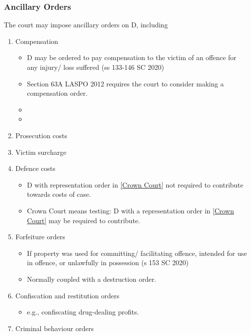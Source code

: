 \documentclass[
]{article}
\providecommand{\tightlist}{%
  \setlength{\itemsep}{0pt}\setlength{\parskip}{0pt}}
\begin{document}
\hypertarget{ancillary-orders}{%
\subsubsection{Ancillary Orders}\label{ancillary-orders}}

The court may impose ancillary orders on D, including

\begin{enumerate}
\def\labelenumi{\arabic{enumi}.}
\tightlist
\item
  Compensation

  \begin{itemize}
  \tightlist
  \item
    D may be ordered to pay compensation to the victim of an offence for
    any injury/ loss suffered (ss 133-146 SC 2020)
  \item
    Section 63A LASPO 2012 requires the court to consider making a
    compensation order.
  \item
  \item
  \end{itemize}
\item
  Prosecution costs
\item
  Victim surcharge
\item
  Defence costs

  \begin{itemize}
  \tightlist
  \item
    D with representation order in
    \href{no\%20financial\%20limit.}{{[}Crown Court{]}} not required to
    contribute towards costs of case.
  \item
    Crown Court means testing: D with a representation order in
    \href{no\%20financial\%20limit.}{{[}Crown Court{]}} may be required
    to contribute.
  \end{itemize}
\item
  Forfeiture orders

  \begin{itemize}
  \tightlist
  \item
    If property was used for committing/ facilitating offence, intended
    for use in offence, or unlawfully in possession (s 153 SC 2020)
  \item
    Normally coupled with a destruction order.
  \end{itemize}
\item
  Confiscation and restitution orders

  \begin{itemize}
  \tightlist
  \item
    e.g., confiscating drug-dealing profits.
  \end{itemize}
\item
  Criminal behaviour orders


\end{enumerate}
\end{document}
